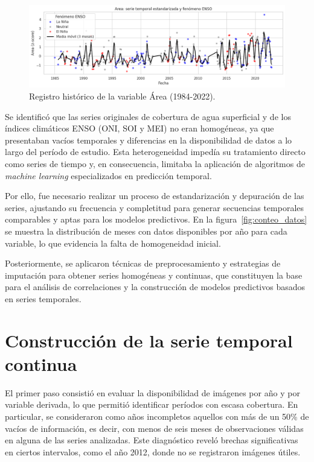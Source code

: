 \begin{figure}[ht]
        \centering
        \includegraphics[scale=.45]
        {Figures/fig16_ts_area.png}
        \caption{Registro histórico de la variable Área (1984-2022).}
        \label{fig:indice_area}
\end{figure}



Se identificó que las series originales de cobertura de agua superficial y de los índices climáticos ENSO (ONI, SOI y MEI) no eran homogéneas, ya que presentaban vacíos temporales y diferencias en la disponibilidad de datos a lo largo del período de estudio. Esta heterogeneidad impedía su tratamiento directo como series de tiempo y, en consecuencia, limitaba la aplicación de algoritmos de \textit{machine learning} especializados en predicción temporal.  

Por ello, fue necesario realizar un proceso de estandarización y depuración de las series, ajustando su frecuencia y completitud para generar secuencias temporales comparables y aptas para los modelos predictivos. En la figura~\ref{fig:conteo_datos} se muestra la distribución de meses con datos disponibles por año para cada variable, lo que evidencia la falta de homogeneidad inicial. 

Posteriormente, se aplicaron técnicas de preprocesamiento y estrategias de imputación para obtener series homogéneas y continuas, que constituyen la base para el análisis de correlaciones y la construcción de modelos predictivos basados en series temporales.  

\section{Construcción de la serie temporal continua}

El primer paso consistió en evaluar la disponibilidad de imágenes por año y por variable 
derivada, lo que permitió identificar períodos con escasa cobertura. En particular, se 
consideraron como años incompletos aquellos con más de un 50\% de vacíos de información, 
es decir, con menos de seis meses de observaciones válidas en alguna de las series 
analizadas. Este diagnóstico reveló brechas significativas en ciertos intervalos, como 
el año 2012, donde no se registraron imágenes útiles.

